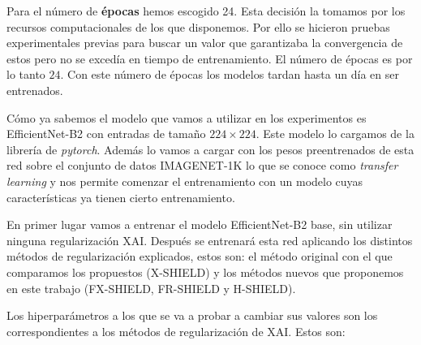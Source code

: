 Para el número de \textbf{épocas} hemos escogido 24. Esta decisión la tomamos por los recursos computacionales de los que disponemos. Por ello se hicieron pruebas experimentales previas para buscar un valor que garantizaba la convergencia de estos pero no se excedía en tiempo de entrenamiento. El número de épocas es por lo tanto $24$. Con este número de épocas los modelos tardan hasta un día en ser entrenados.

Cómo ya sabemos el modelo que vamos a utilizar en los experimentos es EfficientNet-B2 con entradas de tamaño $224 \times 224$. Este modelo lo cargamos de la librería de \textit{pytorch}. Además lo vamos a cargar con los pesos preentrenados de esta red sobre el conjunto de datos IMAGENET-1K lo que se conoce como \textit{transfer learning} y nos permite comenzar el entrenamiento con un modelo cuyas características ya tienen cierto entrenamiento.

En primer lugar vamos a entrenar el modelo EfficientNet-B2 base, sin utilizar ninguna regularización XAI. Después se entrenará esta red aplicando los distintos métodos de regularización explicados, estos son: el método original con el que comparamos los propuestos (X-SHIELD) y los métodos nuevos que proponemos en este trabajo (FX-SHIELD, FR-SHIELD y H-SHIELD).

Los hiperparámetros a los que se va a probar a cambiar sus valores son los correspondientes a los métodos de regularización de XAI. Estos son:

